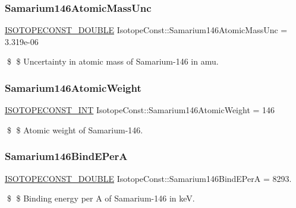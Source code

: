 \subsubsection{\texorpdfstring{Samarium146\+Atomic\+Mass\+Unc}{Samarium146AtomicMassUnc}}
{\footnotesize\ttfamily \mbox{\hyperlink{group___isotope_const-_macros_ga8f45a7272ce02c0b4c65c44636ed719a}{I\+S\+O\+T\+O\+P\+E\+C\+O\+N\+S\+T\+\_\+\+D\+O\+U\+B\+LE}} Isotope\+Const\+::\+Samarium146\+Atomic\+Mass\+Unc = 3.\+319e-\/06}

\$ \$ Uncertainty in atomic mass of Samarium-\/146 in amu. \mbox{\label{group___isotope_const-_samarium-_sm146_ga75fcf00295df3b35479e52fff83e56d9}} 
\subsubsection{\texorpdfstring{Samarium146\+Atomic\+Weight}{Samarium146AtomicWeight}}
{\footnotesize\ttfamily \mbox{\hyperlink{group___isotope_const-_macros_ga5f18360b3e99483a35c32d789e62621c}{I\+S\+O\+T\+O\+P\+E\+C\+O\+N\+S\+T\+\_\+\+I\+NT}} Isotope\+Const\+::\+Samarium146\+Atomic\+Weight = 146}

\$ \$ Atomic weight of Samarium-\/146. \mbox{\label{group___isotope_const-_samarium-_sm146_gafa6beed126e212af8c22d78de50978df}} 
\subsubsection{\texorpdfstring{Samarium146\+Bind\+E\+PerA}{Samarium146BindEPerA}}
{\footnotesize\ttfamily \mbox{\hyperlink{group___isotope_const-_macros_ga8f45a7272ce02c0b4c65c44636ed719a}{I\+S\+O\+T\+O\+P\+E\+C\+O\+N\+S\+T\+\_\+\+D\+O\+U\+B\+LE}} Isotope\+Const\+::\+Samarium146\+Bind\+E\+PerA = 8293.}

\$ \$ Binding energy per A of Samarium-\/146 in keV. \mbox{\label{group___isotope_const-_samarium-_sm146_ga483dd1949c8be0873d50e14ed82e20db}} 
